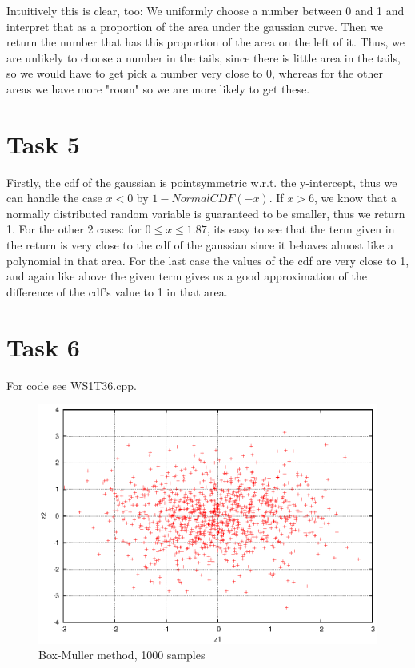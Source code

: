 \documentclass[]{article}
\begin{document}
Intuitively this is clear, too: We uniformly choose a number between 0 and 1 and
interpret that as a proportion of the area under the gaussian curve. Then we
return the number that has this proportion of the area on the left of it. Thus,
we are unlikely to choose a number in the tails, since there is little area in
the tails, so we would have to get pick a number very close to 0, whereas for
the other areas we have more "room" so we are more likely to get these.

\clearpage
\section*{Task 5} Firstly, the cdf of the gaussian is pointsymmetric w.r.t. the
y-intercept, thus we can handle the case $x<0$ by $1-NormalCDF(-x)$. If $x>6$,
we know that a normally distributed random variable is guaranteed to be smaller,
thus we return 1. For the other 2 cases: for $0\le x\le 1.87$, its easy to see
that the term given in the return is very close to the cdf of the gaussian since
it behaves almost like a polynomial in that area. For the last case the values
of the cdf are very close to 1, and again like above the given term gives us a
good approximation of the difference of the cdf's value to 1 in that area.

\section*{Task 6} For code see WS1T36.cpp.
\begin{figure}[!ht]
\centering
\includegraphics{task6}
\caption{Box-Muller method, 1000 samples}
\label{fig:Task6}
\end{figure}
\end{document}
